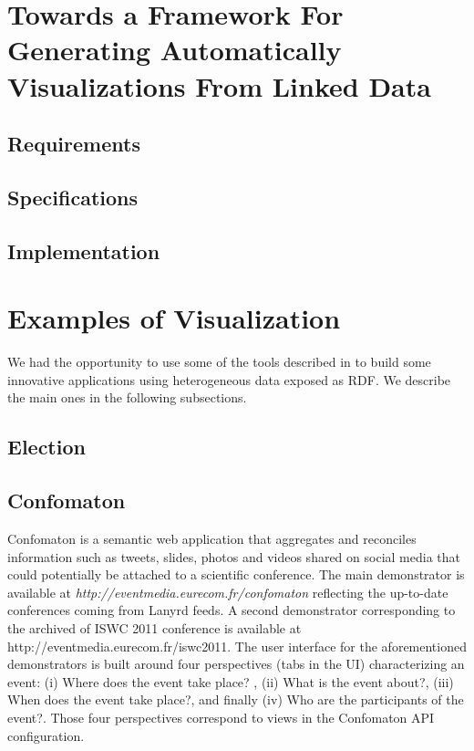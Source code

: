 \documentclass[a4paper,11pt]{report}
\begin{document}
 \section{Towards a Framework For Generating Automatically Visualizations From Linked Data}
  
  \subsection{Requirements}
  \subsection{Specifications}
  \subsection{Implementation}
  

\section{Examples of Visualization}
We had the opportunity to use some of the tools described in \cite{deliverable2012b} to build some innovative applications using heterogeneous data exposed as RDF. We describe the main ones in the following subsections.
 
\subsection{Election}

\subsection{Confomaton}
Confomaton \cite{khrouf-eswc2012} is a semantic web application that aggregates and reconciles information such as tweets, slides, photos and videos shared on social media that could potentially be attached to a scientific conference. The main demonstrator is available at \textit{http://eventmedia.eurecom.fr/confomaton} reflecting the up-to-date conferences coming from Lanyrd feeds. A second demonstrator corresponding to the archived of ISWC 2011 conference \cite{khrouf-ramms12} is available at http://eventmedia.eurecom.fr/iswc2011. The user interface for the aforementioned demonstrators is built around four perspectives (tabs in the UI) characterizing an event: (i) Where does the event take place? , (ii) What is the event about?, (iii) When does the event take place?, and finally (iv) Who are the participants of the event?. Those four perspectives correspond to views in the Confomaton API configuration. 
\end{document}
